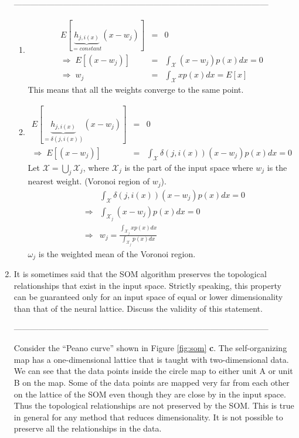 \documentclass[10pt]{article}
\begin{document}
\begin{enumerate}
---------------------------------------------------------------------------------------------

\begin{enumerate}
\item
\begin{eqnarray*}
E[\underbrace{h_{j,i(x)}}_{=constant}(x-w_j)]&=&0\\
\Rightarrow\;E[(x-w_j)]&=&\int_\mathcal{X}(x-w_j)p(x)dx=0\\
\Rightarrow\;w_j&=&\int_\mathcal{X}xp(x)dx=E[x]
\end{eqnarray*}
This means that all the weights converge to the same point.

\item
\begin{eqnarray*}
E[\underbrace{h_{j,i(x)}}_{=\delta(j,i(x))}(x-w_j)]&=&0\\
\Rightarrow\;E[(x-w_j)]&=&\int_\mathcal{X}\delta(j,i(x))(x-w_j)p(x)dx=0
\end{eqnarray*}
Let $\mathcal{X}=\bigcup_j\mathcal{X}_j$, where $\mathcal{X}_j$ is the part
of the input space where $w_j$ is the nearest weight. (Voronoi region
of $w_j$).
\begin{eqnarray*}
& &\int_\mathcal{X}\delta(j,i(x))(x-w_j)p(x)dx=0 \\
&\Rightarrow&\int_{\mathcal{X}_j}(x-w_j)p(x)dx=0\\
&\Rightarrow&w_j=\frac{\int_{\mathcal{X}_j}xp(x)dx}{\int_{\mathcal{X}_j}p(x)dx}
\end{eqnarray*}
$\omega_j$ is the weighted mean of the Voronoi region.
\end{enumerate}

\vspace{2mm}

\vspace{2cm}
\item It is sometimes said that the SOM algorithm preserves the topological relationships that exist in
the input space. Strictly speaking, this property can be guaranteed only for an input space of
equal or lower dimensionality than that of the neural lattice. Discuss the validity of this statement.

---------------------------------------------------------------------------------------------


Consider the ``Peano curve'' shown in Figure \ref{fig:som}{\bf
c}. The self-organizing map has a one-dimensional lattice that is
taught with two-dimensional data. We can see that the data points
inside the circle map to either unit A or unit B on the map. Some of
the data points are mapped very far from each other on the lattice of
the SOM even though they are close by in the input space. Thus the
topological relationships are not preserved by the SOM. This is true
in general for any method that reduces dimensionality. It is
not possible to preserve all the relationships in the data.


\end{enumerate}
\end{document}
